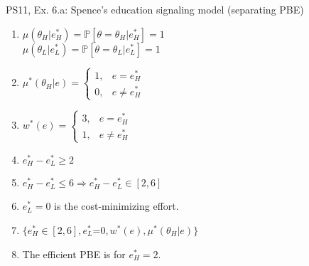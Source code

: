 \begin{frame}{PS11, Ex. 6.a: Spence’s education signaling model (separating PBE)}
\begin{multicols}{2}
\begin{enumerate}
        \item $\mu\left(\theta_H|e_H^*\right)=
               \mathbb{P}\left[\theta=\theta_H|e_H^*\right]=1$\\
              $\mu\left(\theta_L|e_L^*\right)=
               \mathbb{P}\left[\theta=\theta_L|e_L^*\right]=1$
        \item $\mu^*(\theta_H|e)=\left\{\begin{array}{ll}
                  1, & e = e_H^* \\
                  0, & e \neq e_H^*
               \end{array}\right.$
        \item $w^*(e)=\left\{\begin{array}{ll}
                  3, & e = e_H^* \\
                  1, & e \neq e_H^*
               \end{array}\right.$
        \item $e_H^*-e_L^*\geq2$
        \item $e_H^*-e_L^*\leq6\Rightarrow e_H^*-e_L^*\in[2,6]$
        \item $e_L^*=0$ is the cost-minimizing effort.
        \item $\{e_H^*\in[2,6],e_L^*$=$0,w^*(e),\mu^*(\theta_H|e)\}$
        \item The efficient PBE is for $e_H^*=2$.
      \end{enumerate}
      \vfill\null
    \end{multicols}
\end{frame}
